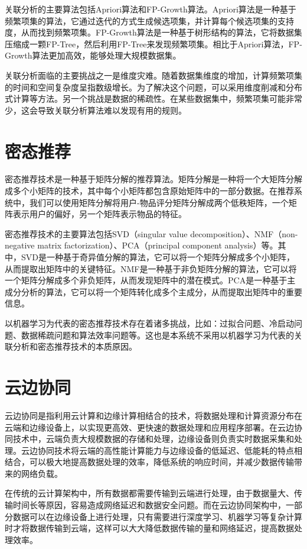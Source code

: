 \documentclass[promaster]{thesis-uestc}
\begin{document}
关联分析的主要算法包括Apriori算法和FP-Growth算法。Apriori算法是一种基于频繁项集的算法，它通过迭代的方式生成候选项集，并计算每个候选项集的支持度，从而找到频繁项集。FP-Growth算法是一种基于树形结构的算法，它将数据集压缩成一颗FP-Tree，然后利用FP-Tree来发现频繁项集。相比于Apriori算法，FP-Growth算法更加高效，能够处理大规模数据集。

关联分析面临的主要挑战之一是维度灾难。随着数据集维度的增加，计算频繁项集的时间和空间复杂度呈指数级增长。为了解决这个问题，可以采用维度削减和分布式计算等方法。另一个挑战是数据的稀疏性。在某些数据集中，频繁项集可能非常少，这会导致关联分析算法难以发现有用的规则。

\section{密态推荐}
密态推荐技术是一种基于矩阵分解的推荐算法。矩阵分解是一种将一个大矩阵分解成多个小矩阵的技术，其中每个小矩阵都包含原始矩阵中的一部分数据。在推荐系统中，我们可以使用矩阵分解将用户-物品评分矩阵分解成两个低秩矩阵，一个矩阵表示用户的偏好，另一个矩阵表示物品的特征。

密态推荐技术的主要算法包括SVD（singular value decomposition）、NMF（non-negative matrix factorization）、PCA（principal component analysis）等。其中，SVD是一种基于奇异值分解的算法，它可以将一个矩阵分解成多个小矩阵，从而提取出矩阵中的关键特征。NMF是一种基于非负矩阵分解的算法，它可以将一个矩阵分解成多个非负矩阵，从而发现矩阵中的潜在模式。PCA是一种基于主成分分析的算法，它可以将一个矩阵转化成多个主成分，从而提取出矩阵中的重要信息。

以机器学习为代表的密态推荐技术存在着诸多挑战，比如：过拟合问题、冷启动问题、数据稀疏问题和算法效率问题等。这也是本系统不采用以机器学习为代表的关联分析和密态推荐技术的本质原因。

\section{云边协同}
云边协同是指利用云计算和边缘计算相结合的技术，将数据处理和计算资源分布在云端和边缘设备上，以实现更高效、更快速的数据处理和应用程序部署。在云边协同技术中，云端负责大规模数据的存储和处理，边缘设备则负责实时数据采集和处理。云边协同技术将云端的高性能计算能力与边缘设备的低延迟、低能耗的特点相结合，可以极大地提高数据处理的效率，降低系统的响应时间，并减少数据传输带来的网络负载。

在传统的云计算架构中，所有数据都需要传输到云端进行处理，由于数据量大、传输时间长等原因，容易造成网络延迟和数据安全问题。而在云边协同架构中，一部分数据可以在边缘设备上进行处理，只有需要进行深度学习、机器学习等复杂计算时才将数据传输到云端，这样可以大大降低数据传输的量和网络延迟，提高数据处理效率。
\end{document}
